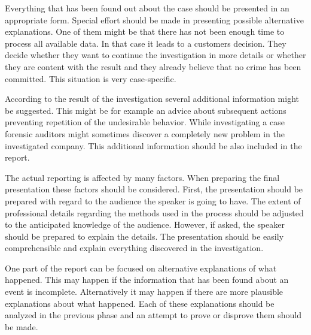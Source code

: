  Everything that has been found out about the case should be presented in an appropriate form. Special effort should be made in presenting possible alternative explanations. One of them might be that there has not been enough time to process all available data. In that case it leads to a customers decision. They decide whether they want to continue the investigation in more details or whether they are content with the result and they already believe that no crime has been committed. This situation is very case-specific. 

According to the result of the investigation several additional information might be suggested. This might be for example an advice about subsequent actions preventing repetition of the undesirable behavior. While investigating a case forensic auditors might sometimes discover a completely new problem in the investigated company. This additional information should be also included in the report. 

The actual reporting is affected by many factors. When preparing the final presentation these factors should be considered. First, the presentation should be prepared with regard to the audience the speaker is going to have. The extent of professional details regarding the methods used in the process should be adjusted to the anticipated knowledge of the audience. However, if asked, the speaker should be prepared to explain the details. The presentation should be easily comprehensible and explain everything discovered in the investigation. 

One part of the report can be focused on alternative explanations of what happened. This may happen if the information that has been found about an event is incomplete. Alternatively it may happen if there are more plausible explanations about what happened. Each of these explanations should be analyzed in the previous phase and an attempt to prove or disprove them should be made.


